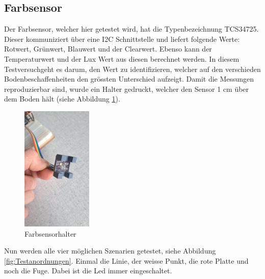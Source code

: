 \subsection{Farbsensor}
Der Farbsensor, welcher hier getestet wird, hat die Typenbezeichnung TCS34725. Dieser kommuniziert über eine I2C Schnittstelle und liefert folgende Werte: Rotwert, Grünwert, Blauwert und der Clearwert. Ebenso kann der Temperaturwert und der Lux Wert aus diesen berechnet werden. In diesem Testversuchgeht es darum, den Wert zu identifizieren, welcher auf den verschieden Bodenbeschaffenheiten den grössten Unterschied aufzeigt. Damit die Messungen reproduzierbar sind, wurde ein Halter gedruckt, welcher den Sensor 1 cm über dem Boden hält (siehe Abbildung \ref{fig:Farbsensorhalter}).


\begin{figure}[H] %
    \centering
    \includegraphics[width=0.3\textwidth]{img/sensortest/FarbsensorHalter.jpg} %
    \caption{Farbsensorhalter}
    \label{fig:Farbsensorhalter} %
\end{figure}

Nun werden alle vier möglichen Szenarien getestet, siehe Abbildung \ref{fig:Testanordnungen}. Einmal die Linie, der weisse Punkt, die rote Platte und noch die Fuge. Dabei ist die Led immer eingeschaltet.


